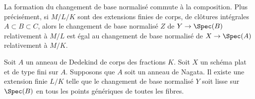 \medskip\noindent
La formation du changement de base normalisé commute à la composition.
Plus précisément, si $M/L/K$ sont des extensions finies
de corps, de clôtures intégrales $A \subset B \subset C$,
alors le changement de base normalisé $Z$ de $Y \to \Spec(B)$
relativement à $M/L$ est égal au changement de base normalisé
de $X \to \Spec(A)$ relativement à $M/K$.

\begin{theorem}
\label{theorem-normalized-base-change-with-reduced-fibre}
Soit $A$ un anneau de Dedekind de corps des fractions $K$.
Soit $X$ un schéma plat et de type fini sur $A$.
Supposons que $A$ soit un anneau de Nagata.
Il existe une extension finie $L/K$ telle que
le changement de base normalisé $Y$ soit lisse sur $\Spec(B)$
en tous les points génériques de toutes les fibres.
\end{theorem}

